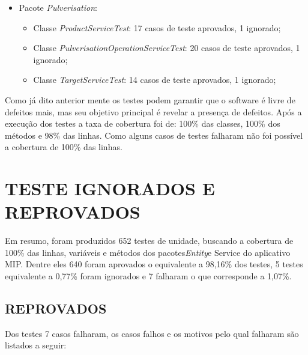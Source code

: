 \begin{itemize}
\begin{itemize}
    \end{itemize}
    \item Pacote \textit{Pulverisation}:
  \begin{itemize}
    \item Classe \textit{ProductServiceTest}: 17 casos de teste aprovados, 1 ignorado;
    \item Classe \textit{PulverisationOperationServiceTest}: 20 casos de teste aprovados, 1 ignorado;
    \item Classe \textit{TargetServiceTest}: 14 casos de teste aprovados, 1 ignorado;
    \end{itemize}
    \end{itemize}



Como já dito anterior mente os testes podem garantir que o software é livre de defeitos mais, mas seu objetivo principal é revelar a presença de defeitos. Após a execução dos testes a taxa de cobertura foi de: 100\% das classes, 100\% dos métodos e 98\% das linhas. Como alguns casos de testes falharam não foi possível a cobertura de 100\% das linhas.


\section{TESTE IGNORADOS E REPROVADOS}

Em resumo, foram produzidos 652 testes de unidade, buscando a cobertura de 100\% das linhas, variáveis e métodos dos pacotes\textit{Entity}e Service do aplicativo MIP. Dentre eles 640 foram aprovados o equivalente a 98,16\% dos testes, 5 testes equivalente a 0,77\% foram ignorados e 7 falharam o que corresponde a 1,07\%.

\subsection{REPROVADOS}

Dos testes 7 casos falharam, os casos falhos e os motivos pelo qual falharam são listados a seguir:

